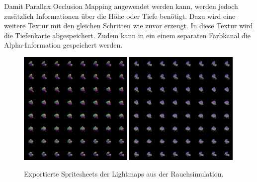 Damit Parallax Occlusion Mapping angewendet werden kann, werden jedoch zusätzlich Informationen über die Höhe oder Tiefe benötigt.
Dazu wird eine weitere Textur mit den gleichen Schritten wie zuvor erzeugt. In diese Textur wird die Tiefenkarte abgespeichert. Zudem kann in ein einem separaten
Farbkanal die Alpha-Information gespeichert werden.


\begin{figure}[h]
	\centering
	\includegraphics[width=0.49\textwidth]{Grafiken/Implementation/Lightmaps/smokeSim_T1.png}
	\includegraphics[width=0.49\textwidth]{Grafiken/Implementation/Lightmaps/smokeSim_T2.png}
	\begin{footnotesize}
		\caption{Exportierte Spritesheets der Lightmaps aus der Rauchsimulation. }
		\label{fig:flipbook}
	\end{footnotesize}
\end{figure}


